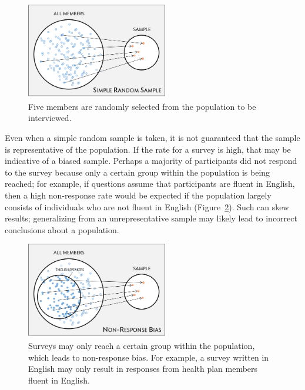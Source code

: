 \textD{\newpage}

\begin{figure}[h]
	\centering
	\includegraphics[width=0.55\textwidth]{ch_01a_intro_to_data_oi_biostat/figures/sampleHealthPlan/sampleRandomHealthPlan.png}
	\caption{Five members are randomly selected from the population to be interviewed.}
	\label{sampleRandomHealthPlan}
\end{figure}

Even when a simple random sample is taken, it is not guaranteed that the sample is representative of the population. If the  rate  for a survey is high, that may be indicative of a biased sample. Perhaps a majority of participants did not respond to the survey because only a certain group within the population is being reached; for example, if questions assume that participants are fluent in English, then a high non-response rate would be expected if the population largely consists of individuals who are not fluent in English 
(Figure~\ref{sampleNonResponseHealthPlan}). Such   can skew results; generalizing from an unrepresentative sample may likely lead to incorrect conclusions about a population. 

\begin{figure}[h]
	\centering
	{\includegraphics[width=0.55\textwidth]{ch_01a_intro_to_data_oi_biostat/figures/sampleHealthPlan/sampleNonResponseHealthPlan.png}
	\caption{Surveys may only reach a certain group within the population, which leads to non-response bias. For example, a survey written in English may only result in responses from health plan members fluent in English.}
	\label{sampleNonResponseHealthPlan}}
\end{figure}

